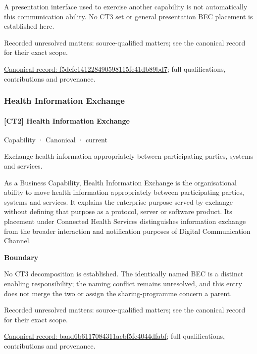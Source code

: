 A presentation interface used to exercise another capability is not automatically this communication ability. No CT3 set or general presentation BEC placement is established here.


{\small Recorded unresolved matters: source-qualified matters; see the canonical record for their exact scope.}\par
{\footnotesize \href{../../../../continuum/strategy/capability/f5defe141228490598115fe41db89bd7.md}{Canonical record: f5defe141228490598115fe41db89bd7}; full qualifications, contributions and provenance.}\par
\subsubsection{Health Information Exchange}

\paragraph{[CT2] Health Information Exchange}

\label{element:baad6b6117084311acbf5fc4044dfabf}
{\small Capability · Canonical · current}\par

Exchange health information appropriately between participating parties, systems and services.



As a Business Capability, Health Information Exchange is the organisational ability to move health information appropriately between participating parties, systems and services. It explains the enterprise purpose served by exchange without defining that purpose as a protocol, server or software product. Its placement under Connected Health Services distinguishes information exchange from the broader interaction and notification purposes of Digital Communication Channel.



\textbf{Boundary}



No CT3 decomposition is established. The identically named BEC is a distinct enabling responsibility; the naming conflict remains unresolved, and this entry does not merge the two or assign the sharing-programme concern a parent.


{\small Recorded unresolved matters: source-qualified matters; see the canonical record for their exact scope.}\par
{\footnotesize \href{../../../../continuum/strategy/capability/baad6b6117084311acbf5fc4044dfabf.md}{Canonical record: baad6b6117084311acbf5fc4044dfabf}; full qualifications, contributions and provenance.}\par
